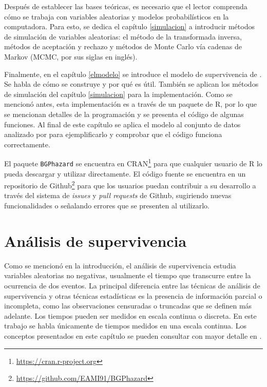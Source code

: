 \documentclass[11pt,a4paper]{article}
\begin{document}
Después de establecer las bases teóricas, es necesario que el lector comprenda cómo se trabaja con variables aleatorias y modelos probabilísticos en la computadora. Para esto, se dedica el capítulo \ref{simulacion} a introducir métodos de simulación de variables aleatorias: el método de la transformada inversa, métodos de aceptación y rechazo y métodos de Monte Carlo vía cadenas de Markov (MCMC, por sus siglas en inglés).

Finalmente, en el capítulo \ref{elmodelo} se introduce el modelo de supervivencia de \citet{nieto}. Se habla de cómo se construye y por qué es útil. También se aplican los métodos de simulación del capítulo \ref{simulacion} para la implementación. Como se mencionó antes, esta implementación es a través de un paquete de R, por lo que se mencionan detalles de la programación y se presenta el código de algunas funciones. Al final de este capítulo se aplica el modelo al conjunto de datos analizado por \citet{nieto} para ejemplificarlo y comprobar que el código funciona correctamente.

El paquete \texttt{BGPhazard} \citep{bgphazard} se encuentra en CRAN\footnote{\url{https://cran.r-project.org}} para que cualquier usuario de R lo pueda descargar y utilizar directamente.  El código fuente se encuentra en un repositorio de Github\footnote{\url{https://github.com/EAMI91/BGPhazard}} para que los usuarios puedan contribuir a su desarrollo a través del sistema de \textit{issues} y \textit{pull requests} de Github, sugiriendo nuevas funcionalidades o señalando errores que se presenten al utilizarlo.

\newpage

\section{Análisis de supervivencia} \label{analisis_sup}

Como se mencionó en la introducción, el análisis de supervivencia estudia variables aleatorias no negativas, usualmente el tiempo que transcurre entre la ocurrencia de dos eventos.  La principal diferencia entre las técnicas de análisis de supervivencia y otras técnicas estadísticas es la presencia de información parcial o incompleta, como las observaciones censuradas o truncadas que se definen más adelante. Los tiempos pueden ser medidos en escala continua o discreta.  En este trabajo se habla únicamente de tiempos medidos en una escala continua. Los conceptos presentados en este capítulo se pueden consultar con mayor detalle en \citet{klein}.
\end{document}
